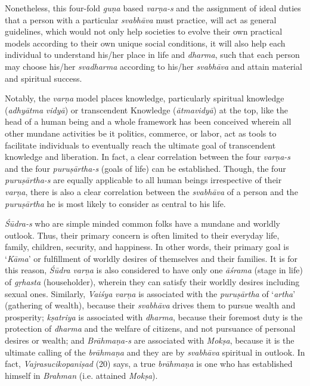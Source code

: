 Nonetheless, this four-fold \emph{guṇa} based \emph{varṇa-s} and the assignment of ideal duties that a person with a particular \emph{svabhāva} must practice, will act as general guidelines, which would not only help societies to evolve their own practical models according to their own unique social conditions, it will also help each individual to understand his/her place in life and \emph{dharma}, such that each person may choose his/her \emph{svadharma} according to his/her \emph{svabhāva} and attain material and spiritual success.

Notably, the \emph{varṇa} model places knowledge, particularly spiritual knowledge (\emph{adhyātma} \emph{vidyā}) or transcendent Knowledge (\emph{ātmavidyā}) at the top, like the head of a human being and a whole framework has been conceived wherein all other mundane activities be it politics, commerce, or labor, act as tools to facilitate individuals to eventually reach the ultimate goal of transcendent knowledge and liberation. In fact, a clear correlation between the four \emph{varṇa-s} and the four \emph{puruṣārtha-s} (goals of life) can be established. Though, the four \emph{puruṣārtha-s} are equally applicable to all human beings irrespective of their \emph{varṇa}, there is also a clear correlation between the \emph{svabhāva} of a person and the \emph{puruṣārtha} he is most likely to consider as central to his life.

\emph{Śūdra-s} who are simple minded common folks have a mundane and worldly outlook. Thus, their primary concern is often limited to their everyday life, family, children, security, and happiness. In other words, their primary goal is `\emph{Kāma}' or fulfillment of worldly desires of themselves and their families. It is for this reason, \emph{Śūdra} \emph{varṇa} is also considered to have only one \emph{āśrama} (stage in life) of \emph{gṛhasta} (householder), wherein they can satisfy their worldly desires including sexual ones. Similarly, \emph{Vaiśya} \emph{varṇa} is associated with the \emph{puruṣārtha} of `\emph{artha}' (gathering of wealth), because their \emph{svabhāva} drives them to pursue wealth and prosperity; \emph{kṣatriya} is associated with \emph{dharma}, because their foremost duty is the protection of \emph{dharma} and the welfare of citizens, and not pursuance of personal desires or wealth; and \emph{Brāhmaṇa-s} are associated with \emph{Mokṣa}, because it is the ultimate calling of the \emph{brāhmaṇa} and they are by \emph{svabhāva} spiritual in outlook. In fact, \emph{Vajrasucikopaniṣad} (20) says, a true \emph{brāhmaṇa} is one who has established himself in \emph{Brahman} (i.e. attained \emph{Mokṣa}).

